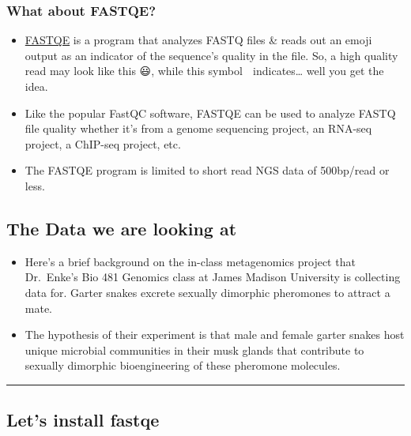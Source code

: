 \documentclass[
]{article}
\begin{document}
\hypertarget{what-about-fastqe}{%
\subsubsection{What about FASTQE?}\label{what-about-fastqe}}

\begin{itemize}
\item
  \href{https://fastqe.com/}{FASTQE} is a program that analyzes FASTQ
  files \& reads out an emoji output as an indicator of the sequence's
  quality in the file. So, a high quality read may look like this 😃,
  while this symbol 💩 indicates\ldots{} well you get the idea.
\item
  Like the popular FastQC software, FASTQE can be used to analyze FASTQ
  file quality whether it's from a genome sequencing project, an RNA-seq
  project, a ChIP-seq project, etc.
\item
  The FASTQE program is limited to short read NGS data of 500bp/read or
  less.
\end{itemize}

\hypertarget{the-data-we-are-looking-at}{%
\subsection{The Data we are looking
at}\label{the-data-we-are-looking-at}}

\begin{itemize}
\item
  Here's a brief background on the in-class metagenomics project that
  Dr.~Enke's Bio 481 Genomics class at James Madison University is
  collecting data for. Garter snakes excrete sexually dimorphic
  pheromones to attract a mate.
\item
  The hypothesis of their experiment is that male and female garter
  snakes host unique microbial communities in their musk glands that
  contribute to sexually dimorphic bioengineering of these pheromone
  molecules.
\end{itemize}

\begin{center}\rule{0.5\linewidth}{0.5pt}\end{center}

\hypertarget{lets-install-fastqe}{%
\subsection{Let's install fastqe}\label{lets-install-fastqe}}
\end{document}
